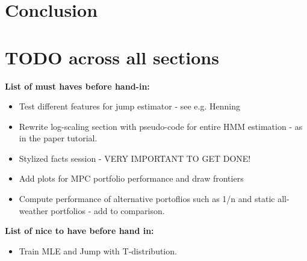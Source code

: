 \newpage

\section{Conclusion}


\section{TODO across all sections}


\textbf{List of must haves before hand-in:}

\begin{itemize}
    \item Test different features for jump estimator - see e.g. Henning
    \item Rewrite log-scaling section with pseudo-code for entire HMM estimation - as in the paper tutorial.
    \item Stylized facts session - VERY IMPORTANT TO GET DONE!
    \item Add plots for MPC portfolio performance and draw frontiers
    \item Compute performance of alternative portoflios such as 1/n and static all-weather portfolios - add to comparison.
\end{itemize}



\textbf{List of nice to have before hand in:}

\begin{itemize}
    \item Train MLE and Jump with T-distribution.
\end{itemize}